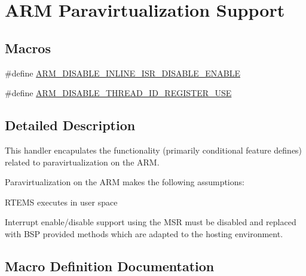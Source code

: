 \hypertarget{group__RTEMSScoreCPUARMParavirt}{}\section{A\+RM Paravirtualization Support}
\label{group__RTEMSScoreCPUARMParavirt}
\subsection*{Macros}
\begin{DoxyCompactItemize}
\item 
\#define \mbox{\hyperlink{group__RTEMSScoreCPUARMParavirt_ga7e4c0e169fbf6b952c60c75b0d1cc968}{A\+R\+M\+\_\+\+D\+I\+S\+A\+B\+L\+E\+\_\+\+I\+N\+L\+I\+N\+E\+\_\+\+I\+S\+R\+\_\+\+D\+I\+S\+A\+B\+L\+E\+\_\+\+E\+N\+A\+B\+LE}}
\item 
\#define \mbox{\hyperlink{group__RTEMSScoreCPUARMParavirt_ga40957e1d781553cdfc2bc3573f1e04ec}{A\+R\+M\+\_\+\+D\+I\+S\+A\+B\+L\+E\+\_\+\+T\+H\+R\+E\+A\+D\+\_\+\+I\+D\+\_\+\+R\+E\+G\+I\+S\+T\+E\+R\+\_\+\+U\+SE}}
\end{DoxyCompactItemize}


\subsection{Detailed Description}
This handler encapulates the functionality (primarily conditional feature defines) related to paravirtualization on the A\+RM.

Paravirtualization on the A\+RM makes the following assumptions\+:


\begin{DoxyItemize}
\item R\+T\+E\+MS executes in user space
\item Interrupt enable/disable support using the M\+SR must be disabled and replaced with B\+SP provided methods which are adapted to the hosting environment. 
\end{DoxyItemize}

\subsection{Macro Definition Documentation}
\mbox{\label{group__RTEMSScoreCPUARMParavirt_ga7e4c0e169fbf6b952c60c75b0d1cc968}} 
